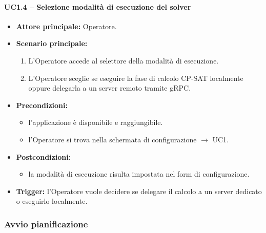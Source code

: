 \paragraph{UC1.4 -- Selezione modalità di esecuzione del solver}
\begin{itemize}
    \item \textbf{Attore principale:} Operatore.
    \item \textbf{Scenario principale:}
    \begin{enumerate}
        \item L'Operatore accede al selettore della modalità di esecuzione.
        \item L'Operatore sceglie se eseguire la fase di calcolo CP-SAT localmente oppure delegarla a un server remoto tramite gRPC.
    \end{enumerate}
    \item \textbf{Precondizioni:}
    \begin{itemize}
        \item l'applicazione è disponibile e raggiungibile.
        \item l'Operatore si trova nella schermata di configurazione $\rightarrow$ UC1.
    \end{itemize}
    \item \textbf{Postcondizioni:}
    \begin{itemize}
        \item la modalità di esecuzione risulta impostata nel form di configurazione.
    \end{itemize}
    \item \textbf{Trigger:} l'Operatore vuole decidere se delegare il calcolo a un server dedicato o eseguirlo localmente.
\end{itemize}

\subsubsection{Avvio pianificazione}

